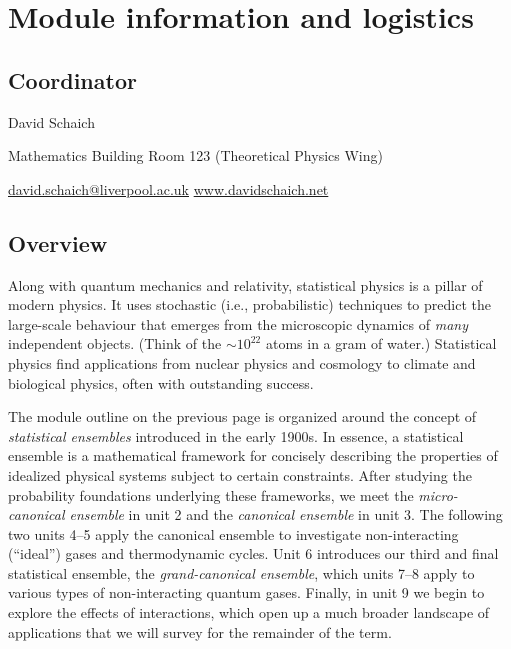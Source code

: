 \newcommand{\thisunit}{MATH327 information}
\newcommand{\moddate}{Last modified 29 Jan.~2022}
\setcounter{section}{0}
{}
\section*{Module information and logistics}

\subsection*{Coordinator}
\begin{description}
  \setlength{\itemsep}{1pt}
  \setlength{\parskip}{0pt}
  \setlength{\parsep}{0pt}
  \item[\qquad] David Schaich
  \item[\qquad] Mathematics Building Room 123 (Theoretical Physics Wing)
  \item[\qquad] \href{mailto:david.schaich@liverpool.ac.uk}{david.schaich@liverpool.ac.uk} \hfill \href{http://www.davidschaich.net}{www.davidschaich.net}
\end{description}



\subsection*{Overview}
Along with quantum mechanics and relativity, statistical physics is a pillar of modern physics.
It uses stochastic (i.e., probabilistic) techniques to predict the large-scale behaviour that emerges from the microscopic dynamics of \emph{many} independent objects.
(Think of the $\sim$$10^{22}$ atoms in a gram of water.)
Statistical physics find applications from nuclear physics and cosmology to climate and biological physics, often with outstanding success.

The module outline on the previous page is organized around the concept of \textit{statistical ensembles} introduced in the early 1900s.
In essence, a statistical ensemble is a mathematical framework for concisely describing the properties of idealized physical systems subject to certain constraints.
After studying the probability foundations underlying these frameworks, we meet the \textit{micro-canonical ensemble} in unit 2 and the \textit{canonical ensemble} in unit 3.
The following two units 4--5 apply the canonical ensemble to investigate non-interacting (``ideal'') gases and thermodynamic cycles.
Unit 6 introduces our third and final statistical ensemble, the \textit{grand-canonical ensemble}, which units 7--8 apply to various types of non-interacting quantum gases.
Finally, in unit 9 we begin to explore the effects of interactions, which open up a much broader landscape of applications that we will survey for the remainder of the term.



